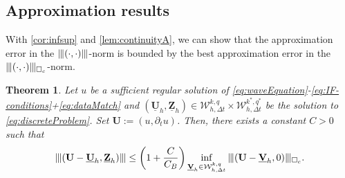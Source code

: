 \documentclass[sn-mathphys-num]{sn-jnl}
\newtheorem{thm}{Theorem}[section]
\numberwithin{equation}{section}
\newcommand{\wop}{\square_c}
\newcommand{\tnorm}[1]{\vert\hspace{-0.3mm}\Vert#1\Vert\hspace{-0.3mm}\vert}
\newcommand{\ProdFullyDiscrSpace}[2]{ \mathcal{W}^{ {#1},{#2}}_{h, \Delta t  } }
\newcommand{\Uh}{\underline{\mathbf{U}}_h}
\newcommand{\Vh}{\underline{\mathbf{V}}_h}
\newcommand{\Zh}{\underline{\mathbf{Z}}_h}
\begin{document}
\subsection{Approximation results}\label{sec:analysis:approx}
With \cref{cor:infsup} and \cref{lem:continuityA}, we can show that the approximation error in the $\tnorm{(\cdot,\cdot)}$-norm is bounded by the best approximation error in the $\tnorm{(\cdot,\cdot)}_{\wop}$-norm.

\begin{thm}\label{thm:bestapprox}
    Let $u$ be a sufficient regular solution of \eqref{eq:waveEquation}-\eqref{eq:IF-conditions}+\eqref{eq:dataMatch} and $(\Uh,\Zh) \in \ProdFullyDiscrSpace{k}{q} \times \ProdFullyDiscrSpace{k^\ast}{q^\ast}$ be the solution to \eqref{eq:discreteProblem}. Set $\mathbf{U} := (u,\partial_t u)$. Then, there exists a constant $C>0$ such that
    \begin{equation}
   \tnorm{(\mathbf{U} - \Uh,\Zh)} \le \left( 1 + \frac{C}{C_B} \right) \inf_{\Vh \in \ProdFullyDiscrSpace{k}{q}} \tnorm{(\mathbf{U} - \Vh, 0)}_{\wop}.  
    \end{equation}
\end{thm}
\end{document}
